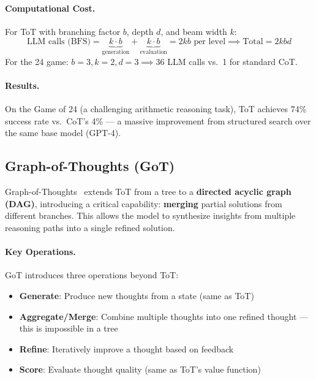 \paragraph{Computational Cost.}
\label{computational-cost.}

For ToT with branching factor $b$, depth $d$, and beam width $k$: 
\begin{equation}
\text{LLM calls (BFS)} = \underbrace{k \cdot b}_{\text{generation}} + \underbrace{k \cdot b}_{\text{evaluation}} = 2kb \text{ per level} \implies \text{Total} = 2kbd
\end{equation}
 For the 24 game: $b=3, k=2, d=3 \implies 36$ LLM calls vs.~1 for standard CoT.

\paragraph{Results.}
\label{results.}

On the Game of 24 (a challenging arithmetic reasoning task), ToT achieves 74\% success rate vs.~CoT’s 4\% --- a massive improvement from structured search over the same base model (GPT-4).

\subsection{Graph-of-Thoughts (GoT)}
\label{subsec:got_method}

Graph-of-Thoughts~\cite{besta2024graph} extends ToT from a tree to a \textbf{directed acyclic graph (DAG)}, introducing a critical capability: \textbf{merging} partial solutions from different branches. This allows the model to synthesize insights from multiple reasoning paths into a single refined solution.

\paragraph{Key Operations.}
\label{key-operations.}

GoT introduces three operations beyond ToT:

\begin{itemize}
  \item \textbf{Generate}: Produce new thoughts from a state (same as ToT)
  \item \textbf{Aggregate/Merge}: Combine multiple thoughts into one refined thought --- this is impossible in a tree
  \item \textbf{Refine}: Iteratively improve a thought based on feedback
  \item \textbf{Score}: Evaluate thought quality (same as ToT’s value function)
\end{itemize}

